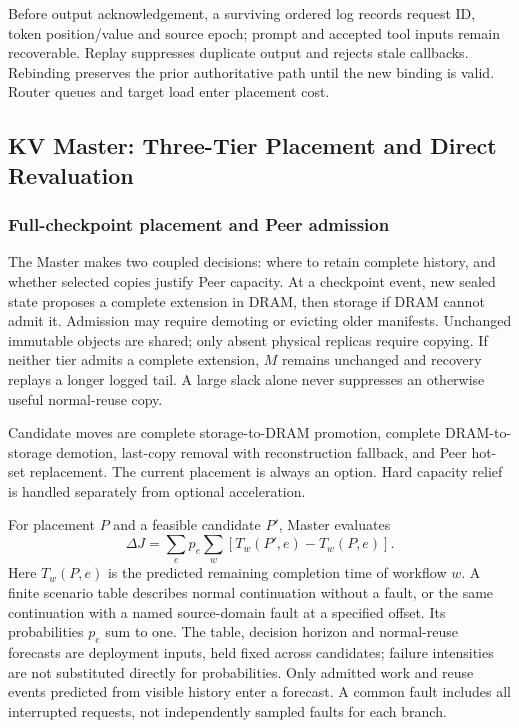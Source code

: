 Before output acknowledgement, a surviving ordered log records request
ID, token position/value and source epoch; prompt and accepted tool inputs
remain recoverable. Replay suppresses duplicate output and rejects stale
callbacks. Rebinding preserves the prior authoritative path until the new
binding is valid. Router queues and target load enter placement cost.

\subsection{KV Master: Three-Tier Placement and Direct Revaluation}
\label{sec:kv-master}

\subsubsection{Full-checkpoint placement and Peer admission}
\label{sec:placement-value}

The Master makes two coupled decisions: where to retain complete history,
and whether selected copies justify Peer capacity. At a checkpoint event,
new sealed state proposes a complete extension in DRAM, then storage if
DRAM cannot admit it. Admission may require demoting or evicting older
manifests. Unchanged immutable objects are shared; only absent physical
replicas require copying. If neither tier admits a complete extension,
$M$ remains unchanged and recovery replays a longer logged tail. A large
slack alone never suppresses an otherwise useful normal-reuse copy.

Candidate moves are complete storage-to-DRAM promotion, complete
DRAM-to-storage demotion, last-copy removal with reconstruction fallback,
and Peer hot-set replacement. The current placement is always an option.
Hard capacity relief is handled separately from optional acceleration.

For placement $P$ and a feasible candidate $P'$, Master evaluates
\begin{equation}
 \Delta J=\sum_e p_e\sum_w
       [T_w(P',e)-T_w(P,e)].
 \label{eq:value}
\end{equation}
Here $T_w(P,e)$ is the predicted remaining completion time of workflow
$w$. A finite scenario table describes normal continuation without a
fault, or the same continuation with a named source-domain fault at a
specified offset. Its probabilities $p_e$ sum to one. The table, decision
horizon and normal-reuse forecasts are deployment inputs, held fixed
across candidates; failure intensities are not substituted directly for
probabilities. Only admitted work and reuse events predicted from visible
history enter a forecast. A common fault includes all interrupted
requests, not independently sampled faults for each branch.

